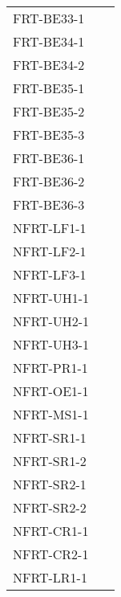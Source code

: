 \documentclass[12pt, titlepage]{article}
\begin{document}
\begin{longtable}{p{} p{}}
	FRT-BE33-1            & ~                \\
	FRT-BE34-1            & ~                \\
	FRT-BE34-2            & ~                \\
	FRT-BE35-1            & ~                \\
	FRT-BE35-2            & ~                \\
	FRT-BE35-3            & ~                \\
	FRT-BE36-1            & ~                \\
	FRT-BE36-2            & ~                \\
	FRT-BE36-3            & ~                \\
	NFRT-LF1-1            & ~                \\
	NFRT-LF2-1            & ~                \\
	NFRT-LF3-1            & ~                \\
	NFRT-UH1-1            & ~                \\
	NFRT-UH2-1            & ~                \\
	NFRT-UH3-1            & ~                \\
	NFRT-PR1-1            & ~                \\
	NFRT-OE1-1            & ~                \\
	NFRT-MS1-1            & ~                \\
	NFRT-SR1-1            & ~                \\
	NFRT-SR1-2            & ~                \\
	NFRT-SR2-1            & ~                \\
	NFRT-SR2-2            & ~                \\
	NFRT-CR1-1            & ~                \\
	NFRT-CR2-1            & ~                \\
	NFRT-LR1-1            & ~                \\
	\bottomrule
\end{longtable}
\end{document}
